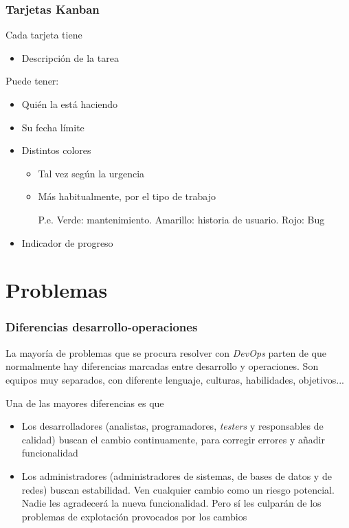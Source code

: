 \documentclass[ucs]{beamer}
\begin{document}
\begin{frame}[fragile]
\frametitle{Tarjetas Kanban}

Cada tarjeta tiene

\begin{itemize}
\item
Descripción de la tarea
\end{itemize}


Puede tener:

\begin{itemize}
\item
Quién la está haciendo

\item
Su fecha límite

\item
Distintos colores

\begin{itemize}
\item
Tal vez según la urgencia
\item
Más habitualmente, por el tipo de trabajo

P.e.  Verde: mantenimiento. 
Amarillo: historia de usuario.
Rojo: Bug
\end{itemize}

\item
Indicador de progreso
\end{itemize}

\end{frame}





\section{Problemas}
\begin{frame}[fragile]
\frametitle{Diferencias desarrollo-operaciones}
La mayoría de problemas que se  procura resolver con
\emph{DevOps}
parten de que 
normalmente hay diferencias marcadas entre desarrollo
y operaciones. Son equipos muy separados, con
diferente lenguaje, culturas, habilidades, objetivos...

Una de las mayores diferencias es que

\begin{itemize}
\item
Los desarrolladores (analistas, programadores,
\emph{testers} y responsables de calidad)
buscan el cambio continuamente, para corregir errores y añadir
funcionalidad

\item
Los administradores (administradores de sistemas, de bases de datos
y de redes) buscan estabilidad. Ven cualquier cambio como un riesgo
potencial. Nadie les agradecerá la nueva funcionalidad. Pero sí
les culparán de los problemas de explotación provocados
por los cambios

\end{itemize}

\end{frame}
\end{document}
